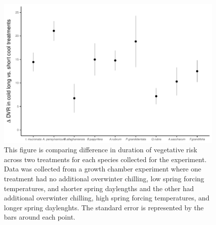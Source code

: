 \documentclass{article}\usepackage[]{graphicx}\usepackage[]{color}
\makeatletter
\def\maxwidth{ %
  \ifdim\Gin@nat@width>\linewidth
    \linewidth
  \else
    \Gin@nat@width
  \fi
}
\makeatother
\begin{document}
\begin{figure}[H]

{\centering \includegraphics[width=\maxwidth]{figure/dan-1} 

}

\caption[This figure is comparing difference in duration of vegetative risk across two treatments for each species collected for the experiment]{This figure is comparing difference in duration of vegetative risk across two treatments for each species collected for the experiment. Data was collected from a growth chamber experiment where one treatment had no additional overwinter chilling, low spring forcing temperatures, and shorter spring daylengths and the other had additional overwinter chilling, high spring forcing temperatures, and longer spring daylenghts. The standard error is represented by the bars around each point.}\label{fig:dan}
\end{figure}
\end{document}
